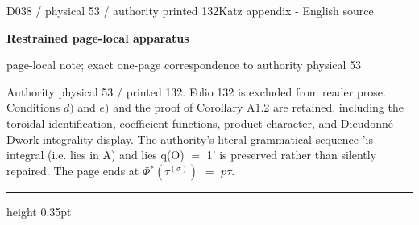 \documentclass[9pt]{article}
\newcommand{\CanonText}[1]{\par{\fontsize{8.0}{9.35}\selectfont\RaggedRight #1\par}\vspace{2.2pt}}
\newcommand{\LayerTitle}{Restrained page-local apparatus}
\begin{document}
\noindent\begin{minipage}[t][\dimexpr\textheight-5pt\relax][t]{\textwidth}
{\sffamily\fontsize{7.3}{8.2}\selectfont\color{Quiet} D038 / physical 53 / authority printed 132\hfill Katz appendix - English source}
\par{}\vspace{4.5pt}
{\sffamily\fontsize{10.4}{11.6}\selectfont\bfseries\color{Accent} \LayerTitle}
\par{\sffamily\fontsize{6.7}{7.7}\selectfont\color{Quiet} page-local note; exact one-page correspondence to authority physical 53}
\vspace{5pt}
\CanonText{Authority physical 53 / printed 132. Folio 132 is excluded from reader prose. Conditions \(d)\) and \(e)\) and the proof of Corollary A1.2 are retained, including the toroidal identification, coefficient functions, product character, and Dieudonné-Dwork integrality display. The authority's literal grammatical sequence 'is integral (i.e. lies in A) and lies q(O) \(=\) 1' is preserved rather than silently repaired. The page ends at \(\Phi{}^{*}(\tau{}^{(\sigma{})})\) \(=\) \(p\tau{}\).}
\vfill
{\color{Accent}\hrule height 0.35pt}\vspace{3pt}
\end{minipage}
\newpage
\end{document}
